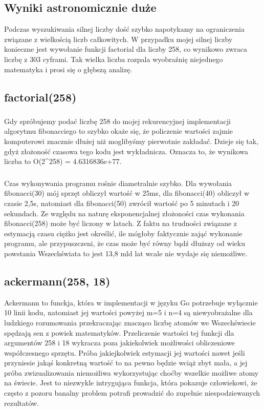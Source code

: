 \documentclass{article}
\begin{document}
\subsection{Wyniki astronomicznie duże}
Podczas wyszukiwania silnej liczby dość szybko napotykamy na ograniczenia związane z wielkością liczb całkowitych. W przypadku mojej silnej liczby konieczne jest wywołanie funkcji factorial dla liczby 258, co wynikowo zwraca liczbę z 303 cyframi. Tak wielka liczba rozpala wyobraźnię niejednego matematyka i prosi się o głębszą analizę.

\subsection{factorial(258)}
\subsubsection{}
Gdy spróbujemy podać liczbę 258 do mojej rekurencyjnej implementacji algorytmu fibonacciego to szybko okaże się, że policzenie wartości zajmie komputerowi znacznie dłużej niż moglibyśmy pierwotnie zakładać. Dzieje się tak, gdyż złożoność czasowa tego kodu jest wykładnicza. Oznacza to, że wynikowa liczba to O(2^258) = 4.6316836e+77. 

\subsubsection{}
Czas wykonywania programu rośnie diametralnie szybko. Dla wywołania fibonacci(30) mój sprzęt obliczył wartość w 25ms, dla fibonacci(40) obliczył w czasie 2,5s, natomiast dla fibonacci(50) zwrócił wartość po 5 minutach i 20 sekundach. Ze względu na naturę eksponencjalnej złożoności czas wykonania fibonacci(258) może być liczony w latach. Z faktu na trudności związane z estymacją czasu ciężko jest określić, ile mógłoby faktycznie zająć wykonanie programu, ale przypuszczeni, że czas może być równy bądź dłuższy od wieku powstania Wszechświata to jest 13,8 mld lat wcale nie wydaje się niemożliwe.

\subsection{ackermann(258, 18)}
Ackermann to funckja, która w implementacji w języku Go potrzebuje wyłącznie 10 linii kodu, natomiast jej wartości powyżej m=5 i n=4 są niewyobrażalne dla ludzkiego rozumowania przekraczając znacząco liczbę atomów we Wszechświecie spędzają sen z powiek matematyków. Przeliczenie wartości tej funkcji dla argumentów 258 i 18 wykracza poza jakiekolwiek możliwości obliczeniowe współczesnego sprzętu. Próba jakiejkolwiek estymacji jej wartości nawet jeśli przyniesie jakąś konkretną wartość to na pewno będzie wciąż zbyt mała, a jej próba zwizualizowania niemożliwa wykorzystując choćby wszelkie możliwe atomy na świecie. Jest to niezwykle intrygująca funkcja, która pokazuje człowiekowi, że często z pozoru banalny problem potrafi prowadzić do zupełnie niespodziewanych rezultatów.
\end{document}
